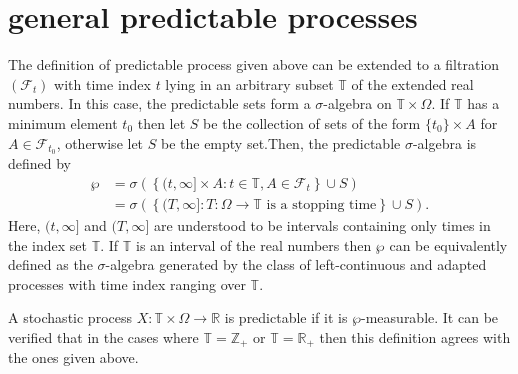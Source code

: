 \documentclass[12pt]{article}
\begin{document}
\section{general predictable processes}

The definition of predictable process given above can be extended to a filtration $(\mathcal{F}_t)$ with time index $t$ lying in an arbitrary subset $\mathbb{T}$ of the extended real numbers. In this case, the predictable sets form a $\sigma$-algebra on $\mathbb{T}\times\Omega$. If $\mathbb{T}$ has a minimum element $t_0$ then let $S$ be the collection of sets of the form $\{t_0\}\times A$ for $A\in\mathcal{F}_{t_0}$, otherwise let $S$ be the empty set.Then, the predictable $\sigma$-algebra is defined by
\begin{equation*}\begin{split}
\wp &=\sigma\left(\left\{(t,\infty]\times A:t\in\mathbb{T},A\in\mathcal{F}_t\right\}\cup S\right)\\
&= \sigma\left(\left\{(T,\infty]:T\colon\Omega\rightarrow\mathbb{T}\textrm{ is a stopping time}\right\}\cup S\right).
\end{split}\end{equation*}
Here, $(t,\infty]$ and $(T,\infty]$ are understood to be intervals containing only times in the index set $\mathbb{T}$. If $\mathbb{T}$ is an interval of the real numbers then $\wp$ can be equivalently defined as the $\sigma$-algebra generated by the class of left-continuous and adapted processes with time index ranging over $\mathbb{T}$.

A stochastic process $X\colon\mathbb{T}\times\Omega\rightarrow\mathbb{R}$ is predictable if it is $\wp$-measurable. It can be verified that in the cases where $\mathbb{T}=\mathbb{Z}_+$ or $\mathbb{T}=\mathbb{R}_+$ then this definition agrees with the ones given above.
\end{document}
